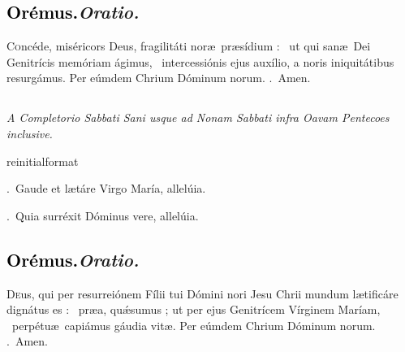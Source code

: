 \documentclass[12pt]{article} %
\newcommand{\myaboveinitial}[1]{%
    \expandafter\renewcommand\csname greinitialformat\endcsname[1]{%
        \fontsize{43}{43}\selectfont ##1
    }
    \gresetfirstlineaboveinitial{\textcolor{benred8}{\raisebox{6.0mm}{\small \textsc{\textbf{#1}}}}}{}
}
\newenvironment{rubric}{\vspace{1 mm}\color{benred8} \itshape \leftskip 0in \setlength{\parindent}{0.25in}}{\vspace{1 mm}}
\newenvironment{response}{\leftskip 0in \setlength{\parindent}{0in}}{\vspace{1 mm}}
\let\oldgresixstar\gresixstar
\renewcommand{\gresixstar}{\textcolor{benred8}{\oldgresixstar}}
\let\oldgredagger\gredagger
\renewcommand{\gredagger}{\textcolor{benred8}{\oldgredagger}}
\let\oldVbar\Vbar
\renewcommand{\Vbar}{\textcolor{benred8}{\oldVbar .}}
\let\oldRbar\Rbar
\renewcommand{\Rbar}{\textcolor{benred8}{\oldRbar .}}
\def\capitulumSpace{\hspace{20 mm}}
\begin{document}
\subsection*{\textcolor{black}{Or\'{e}mus.}\capitulumSpace \emph{Oratio.}}

\begin{response}\lettrine{C}{o}nc\'{e}de, mis\'{e}ricors Deus, fragilit\'{a}ti nor\ae\ pr\ae s\'{i}dium : \gredagger\ ut qui san\ae\ Dei Genitr\'{i}cis mem\'{o}riam \'{a}gimus, \gresixstar\ intercessi\'{o}nis ejus aux\'{i}lio, a noris iniquit\'{a}tibus resurg\'{a}mus. Per e\'{u}mdem Chrium D\'{o}minum norum. \Rbar\ Amen.

\end{response}


\subsection*{}

\begin{rubric}
A Completorio Sabbati Sani usque ad Nonam Sabbati infra Oavam Pentecoes inclusive.

\end{rubric}


\myaboveinitial{VI}

\vspace{2mm}

\begin{response}
\Vbar\ Gaude et l\ae t\'{a}re Virgo Mar\'{i}a, allel\'{u}ia.

\Rbar\ Quia surr\'{e}xit D\'{o}minus vere, allel\'{u}ia.

\end{response}

\subsection*{\textcolor{black}{Or\'{e}mus.}\capitulumSpace \emph{Oratio.}}

\begin{response}\lettrine{D}{e}us, qui per resurrei\'{o}nem F\'{i}lii tui D\'{o}mini nori Jesu Chrii mundum l\ae tific\'{a}re dign\'{a}tus es : \gredagger\ pr\ae{}a, qu\'{\ae}sumus ; ut per ejus Genitr\'{i}cem V\'{i}rginem Mar\'{i}am, \gresixstar\ perp\'{e}tu\ae\ capi\'{a}mus g\'{a}udia vit\ae . Per e\'{u}mdem Chrium D\'{o}minum norum. \Rbar\ Amen.

\end{response}
\end{document}
